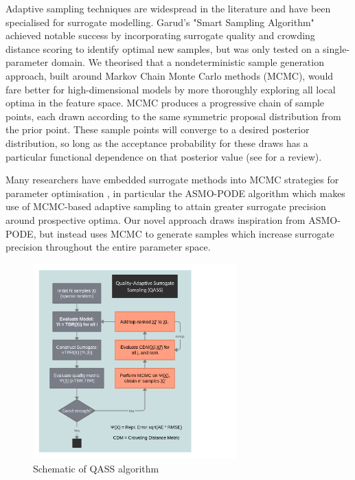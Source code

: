 Adaptive sampling techniques are widespread in the literature and have been
specialised for surrogate modelling. Garud's \cite{Garud2016} "Smart Sampling
Algorithm" achieved notable success by incorporating surrogate quality and
crowding distance scoring to identify optimal new samples, but was only tested
on a single-parameter domain. We theorised that a nondeterministic sample
generation approach, built around Markov Chain Monte Carlo methods (MCMC), would
fare better for high-dimensional models by more thoroughly exploring all local
optima in the feature space. MCMC produces a progressive chain of sample points,
each drawn according to the same symmetric proposal distribution
from the prior point. These sample points will converge to a desired posterior
distribution, so long as the acceptance probability for these draws has a
particular functional dependence on that posterior value (see \cite{Zhou2018}
for a review).


Many researchers have embedded surrogate methods into MCMC strategies for
parameter optimisation \cite{Zhang2020,Gong2017}, in particular the ASMO-PODE
algorithm \cite{Ginting2011} which makes use of MCMC-based adaptive sampling to
attain greater surrogate precision around prospective optima. Our novel approach
draws inspiration from ASMO-PODE, but instead uses MCMC to generate samples
which increase surrogate precision throughout the entire parameter space.

\begin{figure}
  \vspace{-35pt}
  \begin{center}
    \includegraphics[width=0.7\textwidth]{fig4_qassplan.png}
    \caption{Schematic of QASS algorithm}
    \label{fig:qassplan}
  \end{center}
  \vspace{-80pt}
\end{figure}

